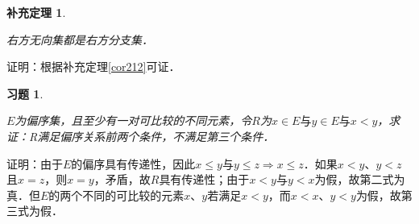 \documentclass[12pt, a4paper, oneside]{book}
\newtheorem{cor}{补充定理}
\newtheorem{exer}{习题}
\begin{document}
			\begin{cor}\label{cor214}
				\hfill\par
				右方无向集都是右方分支集．
			\end{cor}
			证明：根据补充定理\ref{cor212}可证．
			
			\begin{exer}\label{exer77}
				\hfill\par
				$E$为偏序集，且至少有一对可比较的不同元素，令$R$为$x\in E\text{与}y\in E\text{与}x<y$，求证：R满足偏序关系前两个条件，不满足第三个条件．
			\end{exer}
			证明：由于$E$的偏序具有传递性，因此$x\leq y\text{与}y\leq z\Rightarrow x\leq z$．如果$x<y$、$y<z$且$x=z$，则$x=y$，矛盾，故$R$具有传递性；由于$x<y\text{与}y<x$为假，故第二式为真．但$E$的两个不同的可比较的元素$x$、$y$若满足$x<y$，而$x<x$、$y<y$为假，故第三式为假．
			
\end{document}
